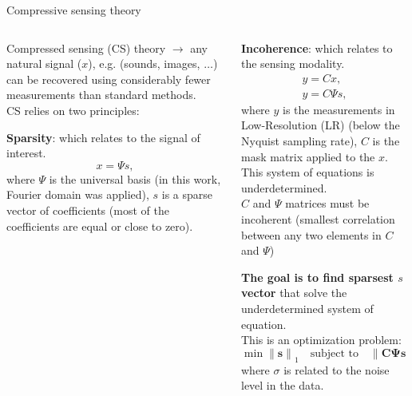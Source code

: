 \documentclass[10pt,aspectratio=169,dvipsnames]{beamer} %
\newcommand{\bs}[1]{\boldsymbol{#1}}
\begin{document}
	\begin{frame}{Compressive sensing theory}
		\footnotesize
		\begin{columns}[T]
			\begin{column}[t]{0.48\textwidth}
				\justifying
				Compressed sensing (CS) theory $\rightarrow$ any natural signal (\(x\)), e.g. (sounds, images, $\dots$) \alert{can be recovered using considerably fewer measurements than standard methods}.
				\\
				CS relies on two principles:
				
				\textbf{\alert{Sparsity}}: which relates to the signal of interest.
				\begin{equation*}
					x=\Psi s,
				\end{equation*}
				where \(\Psi\) is the universal basis (in this work, Fourier domain was applied), \(s\) is a sparse vector of coefficients (\alert{most of the coefficients are equal or close to zero}).			
			\end{column}			
			\begin{column}[t]{0.48\textwidth}
				\justifying
				\textbf{\alert{Incoherence}}: which relates to the sensing modality.
				\begin{gather*}
					y=Cx, \\
					y=C\Psi s,
				\end{gather*}
				where \(y\) is the measurements in \alert{Low-Resolution (LR)} (below the Nyquist sampling rate),
				\(C\) is the mask matrix applied to the \(x\).\\
				This system of equations is \alert{underdetermined}.
				\\
				$C$ and \(\Psi\) matrices must be incoherent \alert{(smallest correlation between any two elements in $C$ and $\Psi$)}	
				
				\textbf{The goal is to find sparsest \(s\) vector} that solve the underdetermined system of equation.
				\\ This is an optimization problem:				
				\begin{equation}
					\min{\lVert {\bs{s}} \rVert}_1 \quad \textrm{subject to} \quad {\lVert \bs{C} \bs{\Psi} \bs{s} -y \rVert}_2 \leq \sigma ,
				\end{equation}
				where $\sigma$ is related to the noise level in the data.										
			\end{column}		
		\end{columns}						
	\end{frame}
	\note
\end{document}
